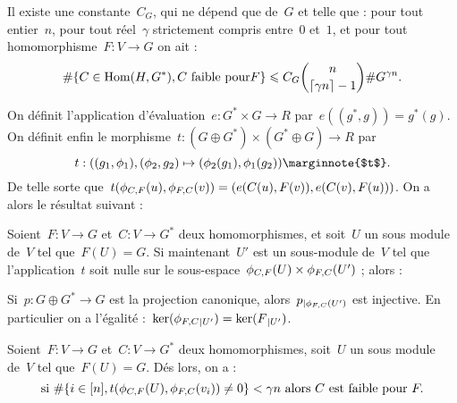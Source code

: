 	\begin{lem}\label{lem:3.1}
		Il existe une constante~$C_G$, qui ne dépend que de~$G$ et telle que : pour tout entier~$n$, pour tout réel~$\gamma$ strictement compris entre~$0$ et~$1$, et pour tout homomorphisme~$F : V \rightarrow G$ on ait :
		\[
			\#\{C\in\operatorname{Hom}(H,G^*), C\text{ faible pour}F\}
			\leqslant
			C_G \binom{n}{\lceil \gamma n\rceil - 1} \# G^{\gamma n}.
		\] 
	\end{lem}
	\begin{dem}
		[TODO]
	\end{dem}
	On définit l'application d'évaluation~$e : G^* \times G \rightarrow R$ par~$e((g^*,g)) = g^*(g)$. On définit enfin le morphisme~$t : (G\oplus G^*) \times (G^*\oplus G) \rightarrow R$ par
	\[
		t : ((g_1,\phi_1),(\phi_2,g_2) \mapsto (\phi_2(g_1) ,\phi_1(g_2))\text{\marginnote{$t$}}.
	\]
	De telle sorte que~$t(\phi_{C,F}(u), \phi_{F,C}(v)) = (e(C(u), F(v)), e(C(v), F(u)))$. On a alors le résultat suivant :
	\begin{lem}\label{lem:3.2}
		Soient~$F: V \rightarrow G$ et~$C : V \rightarrow G^*$ deux homomorphismes, et soit~$U$ un sous module de~$V$ tel que~$F(U)=G$. Si maintenant~$U'$ est un sous-module de~$V$ tel que l'application~$t$ soit nulle sur le sous-espace~$\phi_{C,F}(U)\times\phi_{F,C}(U')$ ; alors :
		
		Si~$p : G \oplus G^* \rightarrow G$ est la projection canonique, alors~$p{}_{|\phi_{F,C}(U')}$ est injective. En particulier on a l'égalité :~$\ker(\phi_{F,C}{}_{|U'}) = \ker(F{}_{|U'})$.
	\end{lem}
	\begin{dem}
		[TODO]
	\end{dem}
	\begin{coro}\label{coro:3.3}
		Soient~$F: V \rightarrow G$ et~$C : V \rightarrow G^*$ deux homomorphismes, soit~$U$ un sous module de~$V$ tel que~$F(U)=G$. Dés lors, on a :
		\[
			\text{si } \#\{i\in[n], t(\phi_{C,F}(U), \phi_{F,C}(v_i)) \neq 0\} < \gamma n
			\text{ alors }C 
			\text{ est faible pour }F.
		\]
	\end{coro}
	\begin{dem}
		[TODO]
	\end{dem}